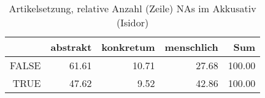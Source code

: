 \begin{table}[ht]
\centering
\begin{tabular}{rrrrr}
  \hline
 & abstrakt & konkretum & menschlich & Sum \\ 
  \hline
FALSE & 61.61 & 10.71 & 27.68 & 100.00 \\ 
  TRUE & 47.62 & 9.52 & 42.86 & 100.00 \\ 
   \hline
\end{tabular}
\caption{Artikelsetzung, relative Anzahl (Zeile) NAs im Akkusativ (Isidor)} 
\end{table}

